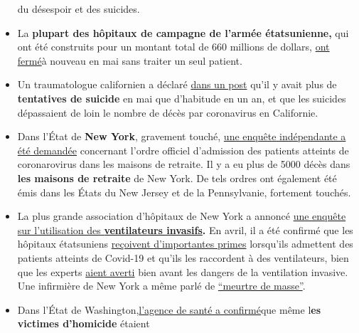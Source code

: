 \begin{itemize}
  du désespoir et des suicides.
\item
  La \textbf{plupart des hôpitaux de campagne de l'armée étatsunienne,}
  qui ont été construits pour un montant total de 660 millions de
  dollars,
  \href{https://www.npr.org/2020/05/07/851712311/u-s-field-hospitals-stand-down-most-without-treating-any-covid-19-patients}{ont
  fermé}à nouveau en mai sans traiter un seul patient.
\item
  Un traumatologue californien a déclaré
  \href{https://www.dailymail.co.uk/news/article-8347011/Doctors-California-say-people-killed-four-weeks-YEAR.html}{dans
  un post} qu'il y avait plus de \textbf{tentatives de suicide} en mai
  que d'habitude en un an, et que les suicides dépassaient de loin le
  nombre de décès par coronavirus en Californie.
\item
  Dans l'État de \textbf{New York}, gravement touché,
  \href{https://nypost.com/2020/05/12/calls-for-independent-probe-of-gov-cuomos-nursing-home-policies/}{une
  enquête indépendante a été demandée} concernant l'ordre officiel
  d'admission des patients atteints de coronarovirus dans les maisons de
  retraite. Il y a eu plus de 5000 décès dans \textbf{les maisons de
  retraite} de New York. De tels ordres ont également été émis dans les
  États du New Jersey et de la Pennsylvanie, fortement touchés.
\item
  La plus grande association d'hôpitaux de New York a annoncé
  \href{https://nypost.com/2020/05/29/northwell-health-probing-use-of-ventilators-for-covid-patients/}{une
  enquête sur l'utilisation des \textbf{ventilateurs
  invasifs}}\textbf{.} En avril, il a été confirmé que les hôpitaux
  étatsuniens
  \href{https://eu.usatoday.com/story/news/factcheck/2020/04/24/fact-check-medicare-hospitals-paid-more-covid-19-patients-coronavirus/3000638001/}{reçoivent
  d'importantes primes} lorsqu'ils admettent des patients atteints de
  Covid-19 et qu'ils les raccordent à des ventilateurs, bien que les
  experts
  \href{https://off-guardian.org/2020/05/06/covid19-are-ventilators-killing-people/}{aient
  averti} bien avant les dangers de la ventilation invasive. Une
  infirmière de New York a même parlé de
  \href{https://nypost.com/2020/05/29/northwell-health-probing-use-of-ventilators-for-covid-patients/}{``meurtre
  de masse''}.
\item
  Dans l'État de
  Washington,\href{https://www.freedomfoundation.com/washington/washington-health-officials-gunshot-victims-counted-as-covid-19-deaths/}{l'agence
  de santé a confirmé}que même l\textbf{es victimes d'homicide} étaient

\end{itemize}
